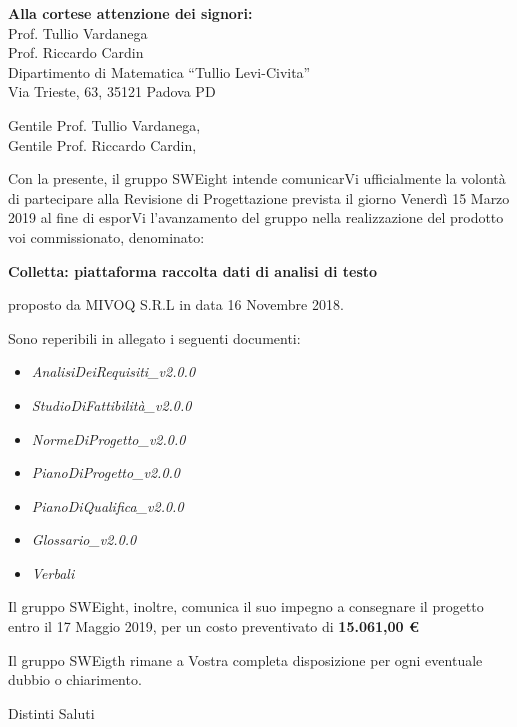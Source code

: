 \documentclass[11pt]{brownletter}
\date{Padova, 08 Marzo 2019} %
\newcommand{\AdR}{\emph{AnalisiDeiRequisiti\_v2.0.0}}
\newcommand{\SdF}{\emph{StudioDiFattibilità\_v2.0.0}}
\newcommand{\NdP}{\emph{NormeDiProgetto\_v2.0.0}}
\newcommand{\PdP}{\emph{PianoDiProgetto\_v2.0.0}}
\newcommand{\PdQ}{\emph{PianoDiQualifica\_v2.0.0}}
\newcommand{\G}{\emph{Glossario\_v2.0.0}}
\begin{document}
\begin{letter}{\textbf{Alla cortese attenzione dei signori:}\\
	Prof. Tullio Vardanega\\
	Prof. Riccardo Cardin\\
	Dipartimento di Matematica “Tullio Levi-Civita”\\
	Via Trieste, 63, 35121 Padova PD}

\opening{	Gentile Prof. Tullio Vardanega,\\
			Gentile Prof. Riccardo Cardin,\\}

Con la presente, il gruppo SWEight intende comunicarVi ufficialmente la volontà di partecipare  alla Revisione di Progettazione prevista il giorno Venerdì 15 Marzo 2019 al fine di esporVi l’avanzamento del gruppo nella realizzazione del prodotto voi commissionato, denominato:
\begin{center}
	\textbf{Colletta: piattaforma raccolta dati di analisi di testo}
\end{center}
proposto da MIVOQ S.R.L in data 16 Novembre 2018.

Sono reperibili in allegato i seguenti documenti:
\begin{itemize}
	\item \AdR
	\item \SdF
	\item \NdP
	\item \PdP
	\item \PdQ
	\item \G
	\item \emph{Verbali}
\end{itemize}
Il gruppo SWEight, inoltre, comunica il suo impegno a consegnare il progetto entro il 17 Maggio 2019, per un costo preventivato di \textbf{15.061,00 \euro}

Il gruppo SWEigth rimane a Vostra completa disposizione per ogni eventuale dubbio o chiarimento.
\closing{Distinti Saluti}

\end{letter}
\end{document}
